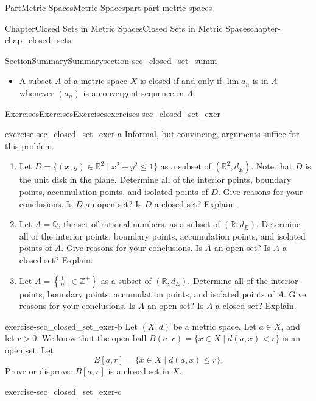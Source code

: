 \documentclass[oneside,10pt,]{book}
\numberwithin{equation}{chapter}
\newcommand{\Z}{\mathbb{Z}}
\newcommand{\Q}{\mathbb{Q}}
\newcommand{\R}{\mathbb{R}}
\newcommand{\lt}{<}
\newcommand{\gt}{>}
\begin{document}
\begin{partptx}{Part}{Metric Spaces}{}{Metric Spaces}{}{}{part-part-metric-spaces}
\begin{chapterptx}{Chapter}{Closed Sets in Metric Spaces}{}{Closed Sets in Metric Spaces}{}{}{chapter-chap_closed_sets}
\begin{sectionptx}{Section}{Summary}{}{Summary}{}{}{section-sec_closed_set_summ}
\begin{itemize}[label=\textbullet]
\item{}A subset \(A\) of a metric space \(X\) is closed if and only if \(\lim a_n\) is in \(A\) whenever \((a_n)\) is a convergent sequence in \(A\).%
\end{itemize}
%
\end{sectionptx}
%
%
\typeout{************************************************}
\typeout{************************************************}
%
\begin{exercises-section}{Exercises}{Exercises}{}{Exercises}{}{}{exercises-sec_closed_set_exer}
\begin{divisionexercise}{1}{}{}{exercise-sec_closed_set_exer-a}%
Informal, but convincing, arguments suffice for this problem.%
\begin{enumerate}[font=\bfseries,label=(\alph*),ref=\alph*]%
\item{}Let \(D = \{(x,y) \in \R^2 \mid x^2+y^2 \leq 1\}\) as a subset of \((\R^2,d_E)\). Note that \(D\) is the unit disk in the plane. Determine all of the interior points, boundary points, accumulation points, and isolated points of \(D\). Give reasons for your conclusions. Is \(D\) an open set? Is \(D\) a closed set? Explain.%
\item{}Let \(A = \Q\), the set of rational numbers, as a subset of \((\R,d_E)\). Determine all of the interior points, boundary points, accumulation points, and isolated points of \(A\). Give reasons for your conclusions. Is \(A\) an open set? Is \(A\) a closed set? Explain.%
\item{}Let \(A = \left\{\frac{1}{n} \ \left| \right. \in \Z^+\right\}\) as a subset of \((\R,d_E)\). Determine all of the interior points, boundary points, accumulation points, and isolated points of \(A\). Give reasons for your conclusions. Is \(A\) an open set? Is \(A\) a closed set? Explain.%
\end{enumerate}%
\end{divisionexercise}%
\begin{divisionexercise}{2}{}{}{exercise-sec_closed_set_exer-b}%
Let \((X,d)\) be a metric space. Let \(a \in X\), and let \(r \gt 0\). We know that the open ball \(B(a,r) = \{x \in X \mid d(a,x) \lt  r\}\) is an open set. Let%
\begin{equation*}
B[a,r] = \{x \in X \mid d(a,x) \leq r\}\text{.}
\end{equation*}
Prove or disprove: \(B[a,r]\) is a closed set in \(X\).%
\end{divisionexercise}%
\begin{divisionexercise}{3}{}{}{exercise-sec_closed_set_exer-c}%

\end{divisionexercise}
\end{exercises-section}
\end{chapterptx}
\end{partptx}
\end{document}

